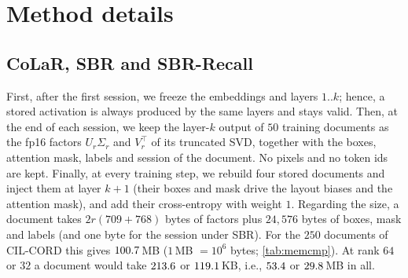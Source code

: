 \section{Method details}
\label{app:method}\label{app:memory}\label{app:analysis}

\subsection{CoLaR, SBR and SBR-Recall}
\label{app:components}

 First, after the first session, we freeze the embeddings and layers $1..k$; hence, a stored activation is always produced by the same layers and stays valid. Then, at the end of each session, we keep the layer-$k$ output of $50$ training documents as the fp16 factors $U_r\Sigma_r$ and $V_r^{\top}$ of its truncated SVD, together with the boxes, attention mask, labels and session of the document. No pixels and no token ids are kept. Finally, at every training step, we rebuild four stored documents and inject them at layer $k{+}1$ (their boxes and mask drive the layout biases and the attention mask), and add their cross-entropy with weight $1$. Regarding the size, a document takes $2r(709{+}768)$ bytes of factors plus $24{,}576$ bytes of boxes, mask and labels (and one byte for the session under SBR). For the $250$ documents of CIL-CORD this gives $100.7$\,MB ($1$\,MB $=10^6$ bytes; \cref{tab:memcmp}). At rank $64$ or $32$ a document would take $213.6$ or $119.1$\,KB, i.e., $53.4$ or $29.8$\,MB in all.

